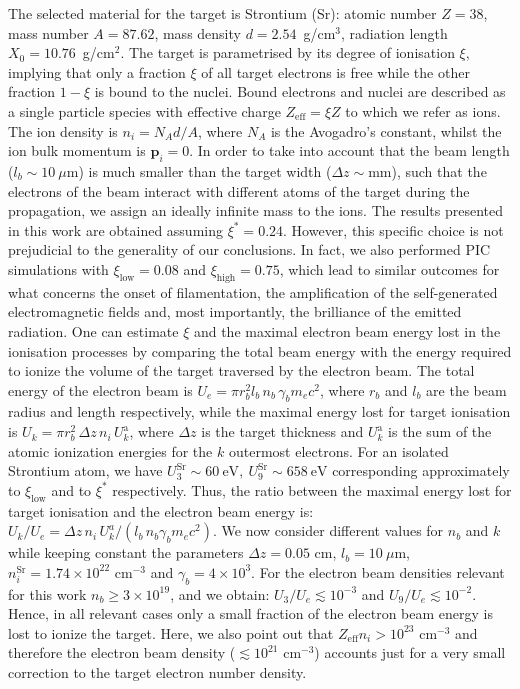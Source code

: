 \documentclass[fleqn,11pt]{wlscirep}
\begin{document}
The selected material for the target is Strontium (Sr): atomic number $Z=38$, mass number $A=87.62$, mass density $d=2.54$~g/cm$^3$, radiation length\cite{Olive:2016xmw} $X_0=10.76$~g/cm$^2$. 
The target is parametrised by its degree of ionisation $\xi$, implying that only a fraction $\xi$ of all target electrons is free while the other fraction $1-\xi$ is bound to the nuclei. Bound electrons and nuclei are described as a single particle species with effective charge $Z_\text{eff}=\xi Z$ to which we refer as ions. 
The ion density is $n_i=N_Ad/A$, where $N_A$ is the Avogadro's constant, whilst the ion bulk momentum is $\boldsymbol{p}_i=0$. 
In order to take into account that the beam length ($l_b\sim10~\mu$m) is much smaller than the target width ($\Delta z\sim\text{mm}$), such that the electrons of the beam interact with different atoms of the target during the propagation, we assign an ideally infinite mass to the ions. 
The results presented in this work are obtained assuming $\xi^*=0.24$. 
However, this specific choice is not prejudicial to the generality of our conclusions. In fact, we also performed PIC simulations with $\xi_\text{low}=0.08$ and $\xi_\text{high}=0.75$, which lead to similar outcomes for what concerns the onset of filamentation, the amplification of the self-generated electromagnetic fields and, most importantly, the brilliance of the emitted radiation. 
One can estimate $\xi$ and the maximal electron beam energy lost in the ionisation processes by comparing the total beam energy with the energy required to ionize the volume of the target traversed by the electron beam. 
The total energy of the electron beam is $U_e=\pi r_b^2 l_b \, n_b \, \gamma_b m_e c^2$, where $r_b$ and $l_b$ are the beam radius and length respectively, while 
the maximal energy lost for target ionisation is $U_k=\pi r_b^2 \, \Delta z \, n_i \, U_k^\text{a}$, where $\Delta z$ is the target thickness and $U_k^\text{a}$ is the sum of the atomic ionization energies for the $k$ outermost electrons. For an isolated Strontium atom, we have\cite{NIST_ASD} $U_3^\text{Sr}\sim60~\text{eV},~U_9^\text{Sr}\sim658~\text{eV}$ corresponding approximately to $\xi_\text{low}$ and to $\xi^*$ respectively. 
Thus, the ratio between the maximal energy lost for target ionisation and the electron beam energy is: $U_k/U_e=\Delta z\,n_i\,U_k^a/(l_b\,n_b\gamma_bm_ec^2)$. 
We now consider different values for $n_b$ and $k$ while keeping constant the parameters $\Delta z=0.05$ cm, $l_b=10~\mu$m, $n_i^\text{Sr}=1.74\times10^{22}$ cm$^{-3}$ and $\gamma_b=4\times10^3$. 
For the electron beam densities relevant for this work $n_b\geq3\times10^{19}$, and we obtain: $U_3/U_e\lesssim10^{-3}$ and $U_9/U_e\lesssim10^{-2}$. Hence, in all relevant cases only a small fraction of the electron beam energy is lost to ionize the target. 
Here, we also point out that $Z_\text{eff}n_i>10^{23}$ cm$^{-3}$ and therefore the electron beam density ($\lesssim10^{21}$ cm$^{-3}$) accounts just for a very small correction to the target electron number density.  
\end{document}
